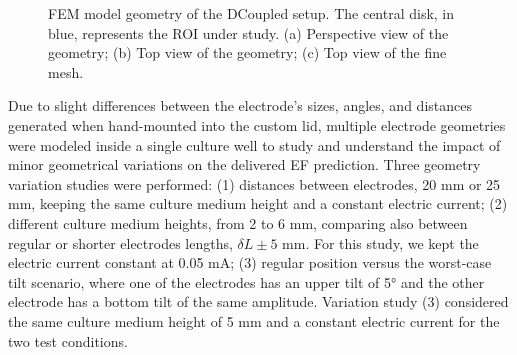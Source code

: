 \begin{figure}
\caption{\acs{FEM} model geometry of the \acs{DCoupled} setup. The central disk, in blue, represents the ROI under study. (a) Perspective view of the geometry; (b) Top view of the geometry; (c) Top view of the fine mesh.}
\label{fig4d3}
\end{figure}

Due to slight differences between the electrode's sizes, angles, and distances generated when hand-mounted into the custom lid, multiple electrode geometries were modeled inside a single culture well to study and understand the impact of minor geometrical variations on the delivered \acs{EF} prediction. Three geometry variation studies were performed: (1) distances between electrodes, 20 \si{\milli\meter} or 25 \si{\milli\meter}, keeping the same culture medium height and a constant electric current; (2) different culture medium heights, from 2 to 6 \si{\milli\meter}, comparing also between regular or shorter electrodes lengths, $\delta L \pm 5$ \si{\milli\meter}. For this study, we kept the electric current constant at \num{0.05} \si{\milli\ampere}; (3) regular position versus the worst-case tilt scenario, where one of the electrodes has an upper tilt of 5\si{\degree} and the other electrode has a bottom tilt of the same amplitude. Variation study (3) considered the same culture medium height of 5 \si{\milli\meter} and a constant electric current for the two test conditions.

